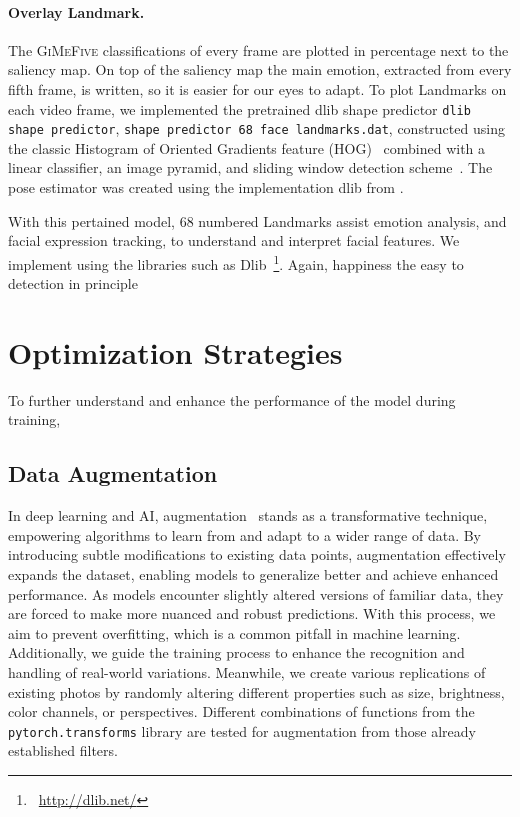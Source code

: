 \paragraph{Overlay Landmark.}
The \textsc{GiMeFive} classifications of every frame are plotted in percentage next to the saliency map.
On top of the saliency map the main emotion, extracted from every fifth frame, is written, 
so it is easier for our eyes to adapt.
To plot Landmarks on each video frame, we implemented the pretrained dlib shape predictor 
\texttt{dlib shape predictor}, \texttt{shape predictor 68 face landmarks.dat}, 
constructed using the classic Histogram of Oriented Gradients feature (HOG)~\cite{1467360} combined with a linear classifier, 
an image pyramid, and sliding window detection scheme~\cite{dlib_site}.
The pose estimator was created using the implementation dlib from \citet{6909637}.

With this pertained model, 68 numbered Landmarks assist emotion analysis, 
and facial expression tracking, to understand and interpret facial features.
We implement using the libraries such as Dlib~\footnote{~\url{http://dlib.net/}}. %
Again,  happiness the easy to detection in principle 



\section{Optimization Strategies}
\label{sec:optim}

To further understand and enhance the performance of the model during training, 

\subsection{Data Augmentation}
\label{sec:optim:aug}

In deep learning and AI, 
augmentation~\cite{augment} stands as a transformative technique, 
empowering algorithms to learn from and adapt to a wider range of data. 
By introducing subtle modifications to existing data points, 
augmentation effectively expands the dataset, 
enabling models to generalize better and achieve enhanced performance. 
As models encounter slightly altered versions of familiar data, 
they are forced to make more nuanced and robust predictions. 
With this process, we aim to prevent overfitting, which is a common pitfall in machine learning. 
Additionally, we guide the training process to enhance the recognition and handling of real-world variations.
Meanwhile, we create various replications of existing photos by randomly altering different properties such as size, brightness, color channels, or perspectives.
Different combinations of functions from the \texttt{pytorch.transforms} library are tested for augmentation from those already established filters. 

